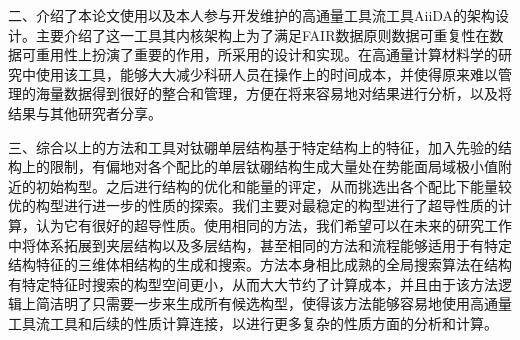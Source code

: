 \documentclass[phd,nobackinfo]{scutthesis}
\begin{document}
二、介绍了本论文使用以及本人参与开发维护的高通量工具流工具AiiDA的架构设计。主要介绍了这一工具其内核架构上为了满足FAIR数据原则数据可重复性在数据可重用性上扮演了重要的作用，所采用的设计和实现。在高通量计算材料学的研究中使用该工具，能够大大减少科研人员在操作上的时间成本，并使得原来难以管理的海量数据得到很好的整合和管理，方便在将来容易地对结果进行分析，以及将结果与其他研究者分享。

三、综合以上的方法和工具对钛硼单层结构基于特定结构上的特征，加入先验的结构上的限制，有偏地对各个配比的单层钛硼结构生成大量处在势能面局域极小值附近的初始构型。之后进行结构的优化和能量的评定，从而挑选出各个配比下能量较优的构型进行进一步的性质的探索。我们主要对最稳定的构型进行了超导性质的计算，认为它有很好的超导性质。使用相同的方法，我们希望可以在未来的研究工作中将体系拓展到夹层结构以及多层结构，甚至相同的方法和流程能够适用于有特定结构特征的三维体相结构的生成和搜索。方法本身相比成熟的全局搜索算法在结构有特定特征时搜索的构型空间更小，从而大大节约了计算成本，并且由于该方法逻辑上简洁明了只需要一步来生成所有候选构型，使得该方法能够容易地使用高通量工具流工具和后续的性质计算连接，以进行更多复杂的性质方面的分析和计算。
\end{document}

